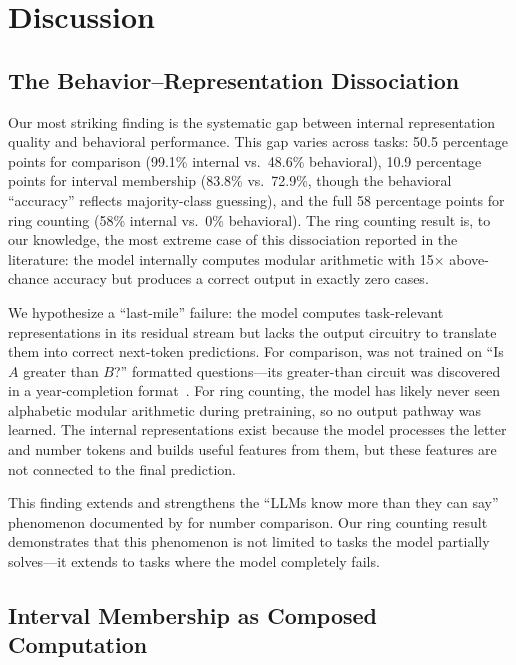 \section{Discussion}
\label{sec:discussion}

\subsection{The Behavior--Representation Dissociation}

Our most striking finding is the systematic gap between internal representation quality and behavioral performance. This gap varies across tasks: 50.5 percentage points for comparison (99.1\% internal vs.\ 48.6\% behavioral), 10.9 percentage points for interval membership (83.8\% vs.\ 72.9\%, though the behavioral ``accuracy'' reflects majority-class guessing), and the full 58 percentage points for ring counting (58\% internal vs.\ 0\% behavioral). The ring counting result is, to our knowledge, the most extreme case of this dissociation reported in the literature: the model internally computes modular arithmetic with 15$\times$ above-chance accuracy but produces a correct output in exactly zero cases.

 We hypothesize a ``last-mile'' failure: the model computes task-relevant representations in its residual stream but lacks the output circuitry to translate them into correct next-token predictions. For comparison, \gptsmall was not trained on ``Is $A$ greater than $B$?'' formatted questions---its greater-than circuit was discovered in a year-completion format~\citep{hanna2023how}. For ring counting, the model has likely never seen alphabetic modular arithmetic during pretraining, so no output pathway was learned. The internal representations exist because the model processes the letter and number tokens and builds useful features from them, but these features are not connected to the final prediction.

This finding extends and strengthens the ``LLMs know more than they can say'' phenomenon documented by \citet{yuchi2026llms} for number comparison. Our ring counting result demonstrates that this phenomenon is not limited to tasks the model partially solves---it extends to tasks where the model completely fails.

\subsection{Interval Membership as Composed Computation}

